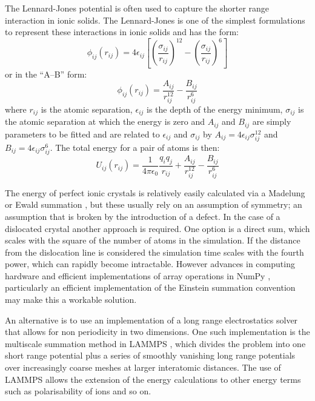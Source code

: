 The Lennard-Jones potential is often used to capture the shorter range interaction in ionic solids. The Lennard-Jones is one of the simplest formulations to represent these interactions in ionic solids and has the form:
\begin{equation}
\phi_{ij}(r_{ij}) = 4\epsilon_{ij} \left[ \left( \frac{\sigma_{ij}}{r_{ij}}\right)^{12}-     \left( \frac{\sigma_{ij}}{r_{ij}}\right)^6   \right]
\end{equation}
or in the ``A--B'' form:
\begin{equation}
\phi_{ij}(r_{ij}) = \frac{A_{ij}}{r_{ij}^{12}} - \frac{B_{ij}}{r_{ij}^{6}}
\end{equation}
where $r_{ij}$ is the atomic separation, $\epsilon_{ij}$ is the depth of the energy minimum, $\sigma_{ij}$ is the atomic separation at which the energy is zero and $A_{ij}$ and $B_{ij}$ are simply parameters to be fitted and are related to $\epsilon_{ij}$ and $\sigma_{ij}$ by $A_{ij} = 4\epsilon_{ij}\sigma_{ij}^{12}$ and $B_{ij} = 4 \epsilon_{ij} \sigma_{ij}^{6}$. The total energy for a pair of atoms is then:
\begin{equation}
U_{ij}(r_{ij}) = \frac{1}{4\pi\epsilon_0} \frac{q_i q_j}{r_{ij}} + \frac{A_{ij}}{r_{ij}^{12}} - \frac{B_{ij}}{r_{ij}^{6}}
\end{equation}




The energy of perfect ionic crystals is relatively easily calculated  via a Madelung or Ewald summation \cite{madelung1918,Ewald1921}, but these usually rely on an assumption of symmetry; an assumption that is broken by the introduction of a defect. In the case of a dislocated crystal another approach is required. One option is a direct sum, which scales with the square of the number of atoms in the simulation. If the distance from the dislocation line is considered the simulation time scales with the fourth power, which can rapidly become intractable. However advances in computing hardware and efficient implementations of array operations in NumPy \cite{Numpy2011}, particularly an efficient implementation of the Einstein summation convention \cite{opt_einsum} may make this a workable solution.


An alternative is to use an implementation of a long range electrostatics solver that allows for non periodicity in two dimensions. One such implementation is the multiscale summation method in LAMMPS \cite{Hardy2009,Plimpton1995,LAMMPS_web}, which divides the problem into one short range potential plus a series of smoothly vanishing long range potentials over increasingly coarse meshes at larger interatomic distances. The use of LAMMPS allows the extension of the energy calculations to other energy terms such as polarisability of ions and so on.


